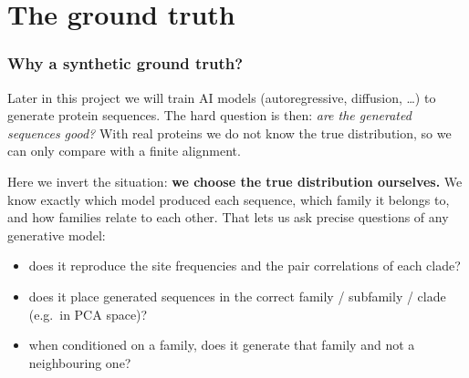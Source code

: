 \documentclass[11pt,a4paper]{article}
\begin{document}
\begin{abstract}
likelihood). Without any label it generates the families and clades in the right proportions and reaches $r_C=0.992$
(true samples 0.994); per clade it matches the tag-conditioned Potts model (\S\ref{sec:md_results}).
Part~IV transposes the speciation and collapse times of Biroli, Bonnaire, de Bortoli and Mézard (2024) from Gaussian
noise to masking. Trajectories decide their family after $\approx2$ revealed residues, their subfamily after
$\approx6$ and their clade after 8--16. The exact minimiser of the loss would collapse onto a training sequence after
6.2 residues, as a parameter-free (quenched) theory predicts; the trained network never does (\S\ref{sec:dr_results}).
This document explains every step from scratch and does not skip derivations.
\end{abstract}

\tableofcontents
\newpage
\part{The ground truth}

\section{Why a synthetic ground truth?}
Later in this project we will train AI models (autoregressive, diffusion, \dots) to generate
protein sequences. The hard question is then: \emph{are the generated sequences good?} With real
proteins we do not know the true distribution, so we can only compare with a finite alignment.

Here we invert the situation: \textbf{we choose the true distribution ourselves.} We know exactly
which model produced each sequence, which family it belongs to, and how families relate to each
other. That lets us ask precise questions of any generative model:
\begin{itemize}[nosep]
  \item does it reproduce the site frequencies and the pair correlations of each clade?
  \item does it place generated sequences in the correct family / subfamily / clade (e.g.\ in PCA space)?
  \item when conditioned on a family, does it generate that family and not a neighbouring one?
\end{itemize}
\end{document}
